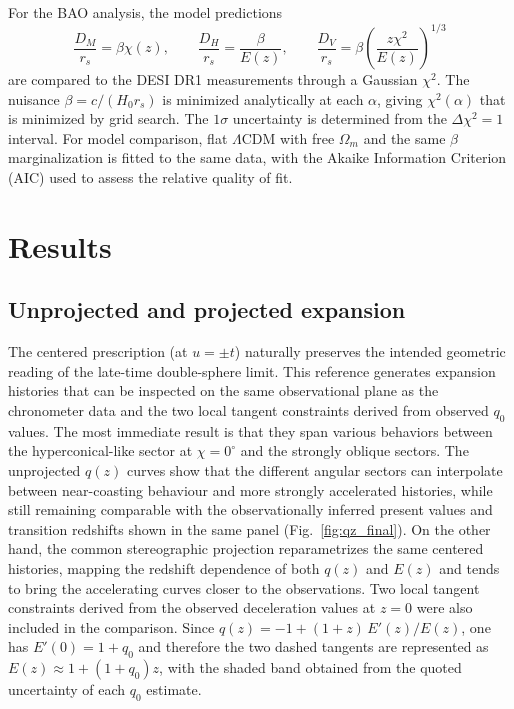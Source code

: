 \documentclass[3p,times,twocolumn]{elsarticle}
\begin{document}
For the BAO analysis, the model predictions
\begin{equation}
\frac{D_M}{r_s} = \beta \chi(z),
\qquad
\frac{D_H}{r_s} = \frac{\beta}{E(z)},
\qquad
\frac{D_V}{r_s} = \beta \left(\frac{z\chi^2}{E(z)}\right)^{1/3}
\end{equation}
are compared to the DESI DR1 measurements through a Gaussian $\chi^2$. The nuisance $\beta = c/(H_0 r_s)$ is minimized analytically at each $\alpha$, giving $\chi^2(\alpha)$ that is minimized by grid search. The $1\sigma$ uncertainty is determined from the $\Delta \chi^2 = 1$ interval. For model comparison, flat $\Lambda$CDM with free $\Omega_m$ and the same $\beta$ marginalization is fitted to the same data, with the Akaike Information Criterion (AIC) used to assess the relative quality of fit.


\section{Results}

\subsection{Unprojected and projected expansion}

The centered prescription (at $u=\pm t$) naturally preserves the intended geometric reading of the late-time double-sphere limit. This reference generates expansion histories that can be inspected on the same observational plane as the chronometer data and the two local tangent constraints derived from observed $q_0$ values.  The most immediate result is that they span various behaviors between the hyperconical-like sector at $\chi=0^\circ$ and the strongly oblique sectors. The unprojected $q(z)$ curves show that the different angular sectors can interpolate between near-coasting behaviour and more strongly accelerated histories, while still remaining comparable with the observationally inferred present values and transition redshifts shown in the same panel (Fig.~\ref{fig:qz_final}). On the other hand, the common stereographic projection reparametrizes the same centered histories, mapping the redshift dependence of both $q(z)$ and $E(z)$ and tends to bring the accelerating curves closer to the observations. Two local tangent constraints derived from the observed deceleration values at $z=0$ were also included in the comparison. Since $q(z)=-1+(1+z)\,E'(z)/E(z)$, one has $E'(0)=1+q_0$ and therefore the two dashed tangents are represented as $E(z)\approx1+(1+q_0)z$, with the shaded band obtained from the quoted uncertainty of each $q_0$ estimate.
\end{document}
